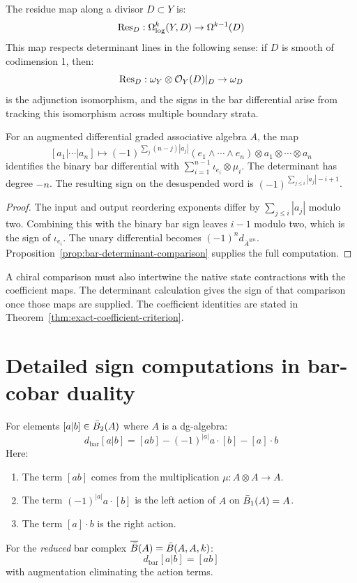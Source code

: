 \begin{proposition}
\label{prop:det-residue}
The residue map along a divisor $D \subset Y$ is:
\[
\operatorname{Res}_D: \Omega^k_{\log}(Y, D) \to \Omega^{k-1}(D)
\]
This map respects determinant lines in the following sense: if $D$ is smooth 
of codimension 1, then:
\[
\operatorname{Res}_D: \omega_Y \otimes \mathcal{O}_Y(D)|_D \to \omega_D
\]
is the adjunction isomorphism, and the signs in the bar differential arise 
from tracking this isomorphism across multiple boundary strata.
\end{proposition}

\begin{theorem}
\label{thm:det-bar-cobar-signs}
For an augmented differential graded associative algebra $A$, the map
\[
[a_1|\cdots|a_n]\longmapsto
(-1)^{\sum_j(n-j)|a_j|}(e_1\wedge\cdots\wedge e_n)
\otimes a_1\otimes\cdots\otimes a_n
\]
identifies the binary bar differential with
$\sum_{i=1}^{n-1}\iota_{e_i}\otimes\mu_i$.
The determinant has degree $-n$.
The resulting sign on the desuspended word is
$(-1)^{\sum_{j\leq i}|a_j|-i+1}$.
\end{theorem}
\begin{proof}
The input and output reordering exponents differ by
$\sum_{j\leq i}|a_j|$ modulo two.
Combining this with the binary bar sign leaves $i-1$ modulo two,
which is the sign of $\iota_{e_i}$.
The unary differential becomes $(-1)^n d_{\bar A^{\otimes n}}$.
Proposition~\ref{prop:bar-determinant-comparison} supplies the full computation.
\end{proof}

A chiral comparison must also intertwine the native state contractions with the coefficient maps.
The determinant calculation gives the sign of that comparison once those maps are supplied.
The coefficient identities are stated in Theorem~\ref{thm:exact-coefficient-criterion}.

\section{Detailed sign computations in bar-cobar duality}
\label{sec:detailed-signs}

\begin{computation}
\label{comp:bar-signs-2-1}
For elements $[a|b] \in \bar{B}_2(A)$ where $A$ is a dg-algebra:
\[
d_{\mathrm{bar}}[a|b] = [ab] - (-1)^{|a|} a \cdot [b] - [a] \cdot b
\]
Here:
\begin{enumerate}[label=(\roman*)]
\item The term $[ab]$ comes from the multiplication $\mu: A \otimes A \to A$.
\item The term $(-1)^{|a|} a \cdot [b]$ is the left action of $A$ on $\bar{B}_1(A) = A$.
\item The term $[a] \cdot b$ is the right action.
\end{enumerate}

For the \emph{reduced} bar complex $\overline{\bar{B}}(A) = \bar{B}(A, A, k)$:
\[
d_{\mathrm{bar}}[a|b] = [ab]
\]
with augmentation eliminating the action terms.
\end{computation}

